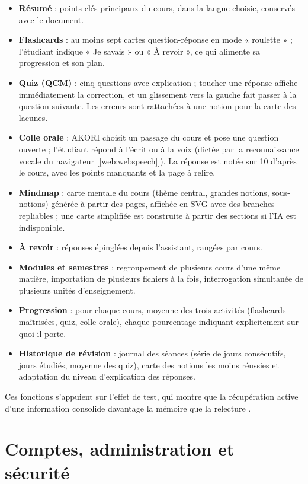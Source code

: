 \documentclass[12pt,a4paper,oneside]{report}
\newcommand{\webref}[1]{[\ref{web:#1}]}
\begin{document}
\begin{itemize}
  \item \textbf{Résumé} : points clés principaux du cours, dans la langue choisie, conservés avec le document.
  \item \textbf{Flashcards} : au moins sept cartes question-réponse en mode « roulette » ; l'étudiant indique « Je savais » ou « À revoir », ce qui alimente sa progression et son plan.
  \item \textbf{Quiz (QCM)} : cinq questions avec explication ; toucher une réponse affiche immédiatement la correction, et un glissement vers la gauche fait passer à la question suivante. Les erreurs sont rattachées à une notion pour la carte des lacunes.
  \item \textbf{Colle orale} : AKORI choisit un passage du cours et pose une question ouverte ; l'étudiant répond à l'écrit ou à la voix (dictée par la reconnaissance vocale du navigateur \webref{webspeech}). La réponse est notée sur 10 d'après le cours, avec les points manquants et la page à relire.
  \item \textbf{Mindmap} : carte mentale du cours (thème central, grandes notions, sous-notions) générée à partir des pages, affichée en SVG avec des branches repliables ; une carte simplifiée est construite à partir des sections si l'IA est indisponible.
  \item \textbf{À revoir} : réponses épinglées depuis l'assistant, rangées par cours.
  \item \textbf{Modules et semestres} : regroupement de plusieurs cours d'une même matière, importation de plusieurs fichiers à la fois, interrogation simultanée de plusieurs unités d'enseignement.
  \item \textbf{Progression} : pour chaque cours, moyenne des trois activités (flashcards maîtrisées, quiz, colle orale), chaque pourcentage indiquant explicitement sur quoi il porte.
  \item \textbf{Historique de révision} : journal des séances (série de jours consécutifs, jours étudiés, moyenne des quiz), carte des notions les moins réussies et adaptation du niveau d'explication des réponses.
\end{itemize}

Ces fonctions s'appuient sur l'effet de test, qui montre que la récupération active d'une information consolide davantage la mémoire que la relecture \cite{roediger2006testing}.

\section{Comptes, administration et sécurité}
\end{document}
